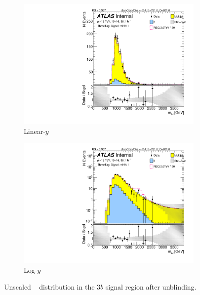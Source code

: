 \begin{figure}[htb!]
\begin{center}
    \captionsetup{justification=centering}
    \begin{subfigure}[b]{0.45\textwidth}
        \includegraphics[width=\textwidth,angle=-90]{figures/boosted/Signal_Syst/Moriond_bkg_9_ThreeTag_Signal_mHH_l.pdf}
        \caption{Linear-$y$}
        \label{fig:boosted-3b-signal-lin}
    \end{subfigure}
    \quad
    \begin{subfigure}[b]{0.45\textwidth}
        \includegraphics[width=\textwidth,angle=-90]{figures/boosted/Signal_Syst/Moriond_bkg_9_ThreeTag_Signal_mHH_l_1.pdf}
        \caption{Log-$y$}
        \label{fig:boosted-3b-signal-log}
    \end{subfigure}
  \caption{Unscaled \mtwoJ~ distribution in the $3b$ signal region after unblinding.}
  \label{fig:boosted-3b-signal-l}
\end{center}
\end{figure}

